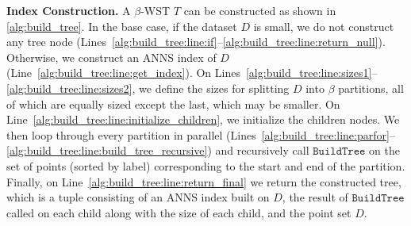 \documentclass{article}
\theoremstyle{plain}
\theoremstyle{definition}
\theoremstyle{remark}
\newcommand{\shangdi}[1]{{\color{blue}{\bf Shangdi:} #1}}
\begin{document}
\textbf{Index Construction.} A $\beta$-WST $T$ can be constructed as shown in \cref{alg:build_tree}. 
In the base case, if the dataset $D$ is small, we do not construct any tree node (Lines~\ref{alg:build_tree:line:if}--\ref{alg:build_tree:line:return_null}).
Otherwise, we construct an ANNS index of $D$ (Line~\ref{alg:build_tree:line:get_index}). On Lines~\ref{alg:build_tree:line:sizes1}--\ref{alg:build_tree:line:sizes2}, we define the sizes for splitting $D$ into $\beta$ partitions, all of which are equally sized except the last, which may be smaller. On Line~\ref{alg:build_tree:line:initialize_children}, we initialize the children nodes. We then loop through every partition in parallel (Lines~\ref{alg:build_tree:line:parfor}--\ref{alg:build_tree:line:build_tree_recursive}) and recursively call $\texttt{BuildTree}$ on the set of points (sorted by label) corresponding to the start and end of the partition. Finally, on Line~\ref{alg:build_tree:line:return_final} we return the constructed tree, which 
is a tuple consisting of an ANNS index built on $D$, the result of $\texttt{BuildTree}$ called on each child along with the size of each child, and the point set $D$. 
\end{document}
